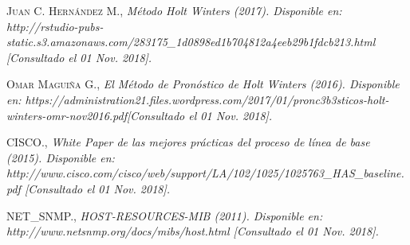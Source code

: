 \begin{thebibliography}{}
 \textsc{Juan C. Hernández M.},
\textit{Método Holt Winters (2017). Disponible en: http://rstudio-pubs-static.s3.amazonaws.com/283175\_1d0898ed1b704812a4eeb29b1fdcb213.html [Consultado el 01 Nov. 2018].}

 \textsc{Omar Maguiña G.},
\textit{El Método de Pronóstico de Holt Winters (2016). Disponible en: https://administration21.files.wordpress.com/2017/01/pronc3b3sticos-holt-winters-omr-nov2016.pdf[Consultado el 01 Nov. 2018].}

 \textsc{CISCO.},
\textit{White Paper de las mejores prácticas del proceso de línea de base (2015). Disponible en: http://www.cisco.com/cisco/web/support/LA/102/1025/1025763\_HAS\_baseline.pdf [Consultado el 01 Nov. 2018].}

 \textsc{NET\_SNMP.},
\textit{HOST-RESOURCES-MIB (2011). Disponible en: http://www.net\-snmp.org/docs/mibs/host.html [Consultado el 01 Nov. 2018].}
\end{thebibliography}